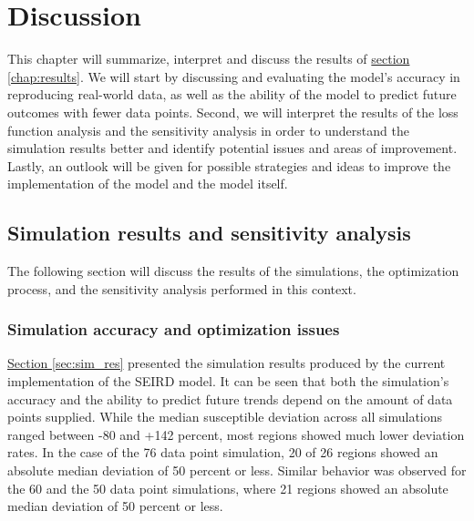
\chapter{Discussion} %
\label{chap:discussion} %

This chapter will summarize, interpret and discuss the results of \hyperref[chap:results]{section
\ref*{chap:results}}. We will start by discussing and evaluating the model's accuracy in  reproducing
real-world data, as well as the ability of the model to predict future outcomes with fewer data points. Second, we will
interpret the results of the loss function analysis and the sensitivity analysis in order to understand the simulation
results better and identify potential issues and areas of improvement. Lastly, an outlook will be given for possible strategies and
ideas to improve the implementation of the model and the model itself.

\section{Simulation results and sensitivity analysis}
The following section will discuss the results of the simulations, the optimization process, and the sensitivity
analysis performed in this context.


\subsection{Simulation accuracy and optimization issues}
\hyperref[sec:sim_res]{Section \ref*{sec:sim_res}} presented the simulation results produced by the current implementation
of the SEIRD model. It can be seen that both the simulation's accuracy and the ability to predict future trends
depend on the amount of data points supplied. While the median susceptible deviation across all simulations ranged between
-80 and +142 percent, most regions showed much lower deviation rates. In the case of the 76 data point simulation, 20 of 26 regions showed an
absolute median deviation of 50 percent or less. Similar behavior was observed for the 60 and the 50 data point simulations, where
21 regions showed an absolute median deviation of 50 percent or less. \newline

